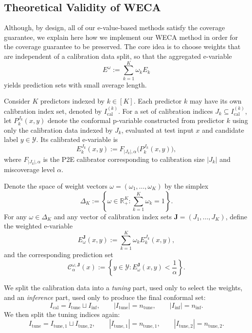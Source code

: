 \documentclass{article}
\theoremstyle{plain}
\theoremstyle{definition}
\theoremstyle{remark}
\begin{document}
\subsection{Theoretical Validity of WECA}

\label{app:weca_validity}




Although, by design, all of our e-value-based methods satisfy the coverage guarantee, we explain here how we implement our WECA method in order for the coverage guarantee to be preserved. The core idea is to choose weights that are independent of a calibration data split, so that the aggregated e-variable
\[
E^\omega := \sum_{k=1}^K \omega_k E_k
\]
yields prediction sets with small average length.

Consider $K$ predictors indexed by $k\in[K]$. Each predictor $k$ may have its own calibration index set, denoted by $I_{\mathrm{cal}}^{(k)}$. For a set of calibration indices $J_k\subseteq I_{\mathrm{cal}}^{(k)}$, let
$P_k^{J_k}(x,y)$
denote the conformal p-variable constructed from predictor $k$ using only the calibration data indexed by $J_k$, evaluated at test input $x$ and candidate label $y\in\mathcal Y$. Its calibrated e-variable is
\[
E_k^{J_k}(x,y)
:=
F_{|J_k|,\alpha}\big(P_k^{J_k}(x,y)\big),
\]
where $F_{|J_k|,\alpha}$ is the P2E calibrator corresponding to calibration size $|J_k|$ and miscoverage level $\alpha$.

Denote the space of weight vectors $\omega=(\omega_1,\dots,\omega_K)$ by the simplex
\[
\Delta_K
:=
\left\{
\omega\in\mathbb R_+^K:
\sum_{k=1}^K \omega_k=1
\right\}.
\]
For any $\omega\in\Delta_K$ and any vector of calibration index sets
$\mathbf J=(J_1,\ldots,J_K)$, define the weighted e-variable
\[
E_\omega^{\mathbf J}(x,y)
:=
\sum_{k=1}^K \omega_k E_k^{J_k}(x,y),
\]
and the corresponding prediction set
\[
\mathcal C_{\alpha}^{\omega,\mathbf J}(x)
:=
\left\{
y\in\mathcal Y:
E_\omega^{\mathbf J}(x,y)<\frac1\alpha
\right\}.
\]

We split the calibration data into a \emph{tuning} part, used only to select the weights, and an \emph{inference} part, used only to produce the final conformal set:
\[
I_{\mathrm{cal}}
=
I_{\mathrm{tune}}\sqcup I_{\mathrm{inf}},
\qquad
|I_{\mathrm{tune}}|=n_{\mathrm{tune}},
\qquad
|I_{\mathrm{inf}}|=n_{\mathrm{inf}}.
\]
We then split the tuning indices again:
\[
I_{\mathrm{tune}}
=
I_{\mathrm{tune},1}
\sqcup
I_{\mathrm{tune},2},
\qquad
|I_{\mathrm{tune},1}|=n_{\mathrm{tune},1},
\qquad
|I_{\mathrm{tune},2}|=n_{\mathrm{tune},2}.
\]
\end{document}

